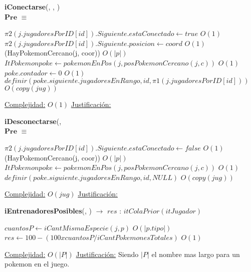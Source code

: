 \begin{algorithm}[H]{\textbf{iConectarse}(, , )}
	{\\ $\textbf{Pre}$ $\equiv$ }
	\begin{algorithmic}
		\State $\pi 2(j.jugadoresPorID[id]).Siguiente.estaConectado \gets true $ \Comment $O(1)$
		\State $\pi 2(j.jugadoresPorID[id]).Siguiente.posicion \gets coord $ \Comment $O(1)$
		\If(HayPokemonCercano(j, coor)) \Comment $O(|p|)$
		\State $ItPokemon poke \gets pokemonEnPos(j,posPokemonCercano(j,c))$ \Comment $O(1)$
		\State $poke.contador \gets 0$ \Comment $O(1)$
	\State $ definir(poke.siguiente.jugadoresEnRango,id,\pi 1(j.jugadoresPorID[id])) $ \Comment $O(copy(jug))$
		\EndIf
	
		\medskip
		\Statex \underline{Complejidad:} $O(1)$
		\Statex \underline{Justificación:}  
    \end{algorithmic}
\end{algorithm}

\begin{algorithm}[H]{\textbf{iDesconectarse}(, } 
	{\\ $\textbf{Pre}$ $\equiv$ }
	\begin{algorithmic}
		\State $\pi 2(j.jugadoresPorID[id]).Siguiente.estaConectado \gets false $ \Comment $O(1)$
		\If(HayPokemonCercano(j, coor)) \Comment $O(|p|)$
		\State $ItPokemon poke \gets pokemonEnPos(j,posPokemonCercano(j,c))$ \Comment $O(1)$
		\State $definir(poke.siguiente.jugadoresEnRango,id,NULL) $ \Comment $O(copy(jug))$
		\EndIf
	
		\medskip
		\Statex \underline{Complejidad:} $O(jug)$
		\Statex \underline{Justificación:}  
    \end{algorithmic}
\end{algorithm}

\begin{algorithm}[H]{\textbf{iEntrenadoresPosibles}(, )  $\to$ $res$ : $itColaPrior(itJugador)$} 
	{}
	\begin{algorithmic}
		\State $cuantosP \gets iCantMismaEspecie(j, p) $ \Comment $O(|p.tipo|)$
		\State $res \gets 100 - (100 x cuantosP / iCantPokemonesTotales) $ \Comment $O(1)$
	
		\medskip
		\Statex \underline{Complejidad:} $O(|P|)$
		\Statex \underline{Justificación:} Siendo $|P|$ el nombre mas largo para un pokemon en el juego.
    \end{algorithmic}
\end{algorithm}

